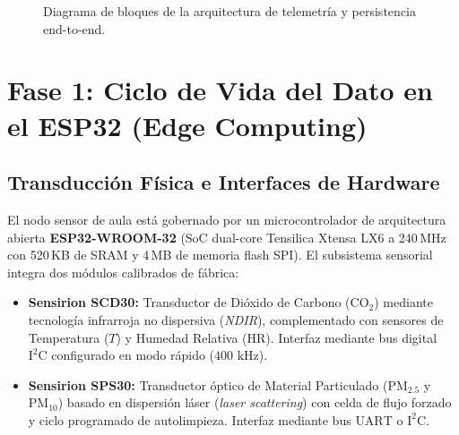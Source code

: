\documentclass[11pt,a4paper]{article}
\begin{document}
\begin{figure}[H]
\caption{Diagrama de bloques de la arquitectura de telemetría y persistencia end-to-end.}
\label{fig:arquitectura_end_to_end}
\end{figure}

\clearpage

\section{Fase 1: Ciclo de Vida del Dato en el ESP32 (Edge Computing)}

\subsection{Transducción Física e Interfaces de Hardware}
El nodo sensor de aula está gobernado por un microcontrolador de arquitectura abierta \textbf{ESP32-WROOM-32} (SoC dual-core Tensilica Xtensa LX6 a 240\,MHz con 520\,KB de SRAM y 4\,MB de memoria flash SPI). El subsistema sensorial integra dos módulos calibrados de fábrica:
\begin{itemize}
    \item \textbf{Sensirion SCD30:} Transductor de Dióxido de Carbono ($\text{CO}_2$) mediante tecnología infrarroja no dispersiva (\textit{NDIR}), complementado con sensores de Temperatura ($T$) y Humedad Relativa ($\text{HR}$). Interfaz mediante bus digital $\text{I}^2\text{C}$ configurado en modo rápido ($400\text{ kHz}$).
    \item \textbf{Sensirion SPS30:} Transductor óptico de Material Particulado ($\text{PM}_{2.5}$ y $\text{PM}_{10}$) basado en dispersión láser (\textit{laser scattering}) con celda de flujo forzado y ciclo programado de autolimpieza. Interfaz mediante bus $\text{UART}$ o $\text{I}^2\text{C}$.
\end{itemize}
\end{document}
